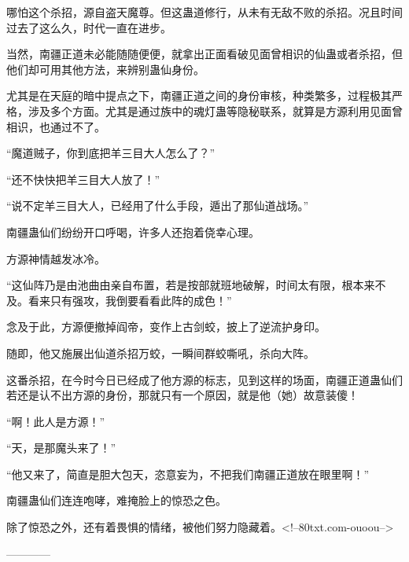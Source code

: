 \begin{this_body}
哪怕这个杀招，源自盗天魔尊。但这蛊道修行，从未有无敌不败的杀招。况且时间过去了这么久，时代一直在进步。

当然，南疆正道未必能随随便便，就拿出正面看破见面曾相识的仙蛊或者杀招，但他们却可用其他方法，来辨别蛊仙身份。

尤其是在天庭的暗中提点之下，南疆正道之间的身份审核，种类繁多，过程极其严格，涉及多个方面。尤其是通过族中的魂灯蛊等隐秘联系，就算是方源利用见面曾相识，也通过不了。

“魔道贼子，你到底把羊三目大人怎么了？”

“还不快快把羊三目大人放了！”

“说不定羊三目大人，已经用了什么手段，遁出了那仙道战场。”

南疆蛊仙们纷纷开口呼喝，许多人还抱着侥幸心理。

方源神情越发冰冷。

“这仙阵乃是由池曲由亲自布置，若是按部就班地破解，时间太有限，根本来不及。看来只有强攻，我倒要看看此阵的成色！”

念及于此，方源便撤掉阎帝，变作上古剑蛟，披上了逆流护身印。

随即，他又施展出仙道杀招万蛟，一瞬间群蛟嘶吼，杀向大阵。

这番杀招，在今时今日已经成了他方源的标志，见到这样的场面，南疆正道蛊仙们若还是认不出方源的身份，那就只有一个原因，就是他（她）故意装傻！

“啊！此人是方源！”

“天，是那魔头来了！”

“他又来了，简直是胆大包天，恣意妄为，不把我们南疆正道放在眼里啊！”

南疆蛊仙们连连咆哮，难掩脸上的惊恐之色。

除了惊恐之外，还有着畏惧的情绪，被他们努力隐藏着。<!--80txt.com-ouoou-->

------------

\end{this_body}

